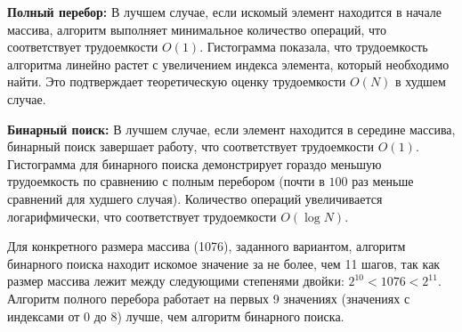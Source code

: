 \textbf{Полный перебор:}
В лучшем случае, если искомый элемент находится в начале массива, алгоритм выполняет минимальное количество операций, что соответствует трудоемкости $O(1)$.
Гистограмма показала, что трудоемкость алгоритма линейно растет с увеличением индекса элемента, который необходимо найти. Это подтверждает теоретическую оценку трудоемкости $O(N)$ в худшем случае.

\textbf{Бинарный поиск:}
В лучшем случае, если элемент находится в середине массива, бинарный поиск завершает работу, что соответствует трудоемкости $O(1)$.
Гистограмма для бинарного поиска демонстрирует гораздо меньшую трудоемкость по сравнению с полным перебором (почти в $100$ раз меньше сравнений для худшего случая). Количество операций увеличивается логарифмически, что соответствует трудоемкости $O(\log N)$.

Для конкретного размера массива (1076), заданного вариантом, алгоритм бинарного поиска находит искомое значение за не более, чем 11 шагов, так как размер массива лежит между следующими степенями двойки: $2^{10} < 1076 < 2^{11}$. Алгоритм полного перебора работает на первых 9 значениях (значениях с индексами от $0$ до $8$) лучше, чем алгоритм бинарного поиска.